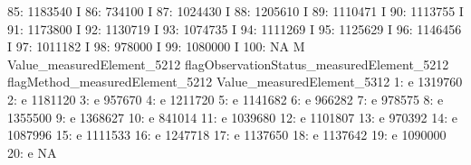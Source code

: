 \documentclass[nojss]{jss}
\begin{document}
\begin{Schunk}
\begin{Soutput}
 85:                    1183540                                          I
 86:                     734100                                          I
 87:                    1024430                                          I
 88:                    1205610                                          I
 89:                    1110471                                          I
 90:                    1113755                                          I
 91:                    1173800                                          I
 92:                    1130719                                          I
 93:                    1074735                                          I
 94:                    1111269                                          I
 95:                    1125629                                          I
 96:                    1146456                                          I
 97:                    1011182                                          I
 98:                     978000                                          I
 99:                    1080000                                          I
100:                         NA                                          M
     Value_measuredElement_5212 flagObservationStatus_measuredElement_5212
     flagMethod_measuredElement_5212 Value_measuredElement_5312
  1:                               e                    1319760
  2:                               e                    1181120
  3:                               e                     957670
  4:                               e                    1211720
  5:                               e                    1141682
  6:                               e                     966282
  7:                               e                     978575
  8:                               e                    1355500
  9:                               e                    1368627
 10:                               e                     841014
 11:                               e                    1039680
 12:                               e                    1101807
 13:                               e                     970392
 14:                               e                    1087996
 15:                               e                    1111533
 16:                               e                    1247718
 17:                               e                    1137650
 18:                               e                    1137642
 19:                               e                    1090000
 20:                               e                         NA

\end{Soutput}
\end{Schunk}
\end{document}
